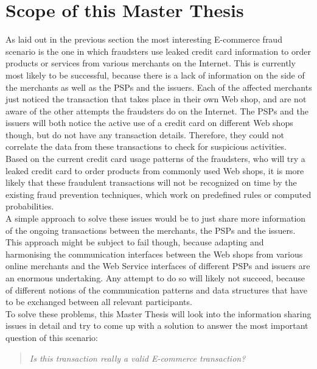 
\section{Scope of this Master Thesis}
\label{sec:scope_thesis}

As laid out in the previous section the most interesting \gls{E-commerce} fraud scenario is the one in which fraudsters use leaked credit card information to order products or services from various merchants on the Internet. This is currently most likely to be successful, because there is a lack of information on the side of the merchants as well as the \gls{PSP}s and the issuers. Each of the affected merchants just noticed the transaction that takes place in their own Web shop, and are not aware of the other attempts the fraudsters do on the Internet. The \gls{PSP}s and the issuers will both notice the active use of a credit card on different Web shops though, but do not have any transaction details. Therefore, they could not correlate the data from these transactions to check for suspicious activities. \\

Based on the current credit card usage patterns of the fraudsters, who will try a leaked credit card to order products from commonly used Web shops, it is more likely that these fraudulent transactions will not be recognized on time by the existing fraud prevention techniques, which work on predefined rules or computed probabilities. \\

A simple approach to solve these issues would be to just share more information of the ongoing transactions between the merchants, the \gls{PSP}s and the issuers. This approach might be subject to fail though, because adapting and harmonising the communication interfaces between the Web shops from various online merchants and the Web Service interfaces of different \gls{PSP}s and issuers are an enormous undertaking. Any attempt to do so will likely not succeed, because of different notions of the communication patterns and data structures that have to be exchanged between all relevant participants. \\

To solve these problems, this Master Thesis will look into the information sharing issues in detail and try to come up with a solution to answer the most important question of this scenario: \@

\begin{quotation}
  \textit{Is this transaction really a valid \gls{E-commerce} transaction?}
\end{quotation}

